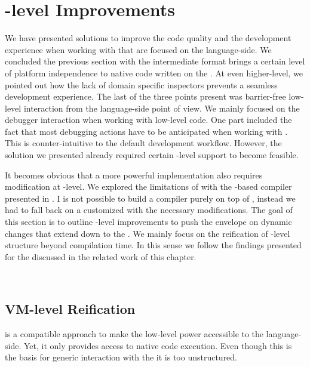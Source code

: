 \section{\VM-level Improvements}
We have presented solutions to improve the code quality and the development experience when working with \B that are focused on the language-side.
We concluded the previous section with the \VCPU intermediate format brings a certain level of platform independence to native code written on the \B.
At even higher-level, we pointed out how the lack of domain specific inspectors prevents a seamless development experience.
The last of the three points present was barrier-free low-level interaction from the language-side point of view.
We mainly focused on the debugger interaction when working with low-level \B code.
One part included the fact that most debugging actions have to be anticipated when working with \B.
This is counter-intuitive to the default \PH development workflow.
However, the solution we presented already required certain \VM-level support to become feasible.

It becomes obvious that a more powerful \B implementation also requires modification at \VM-level.
We explored the limitations of \B with \NBJ the \B-based \JIT compiler presented in .
I is not possible to build a \JIT compiler purely on top of \B, instead we had to fall back on a customized \VM with the necessary modifications.
The goal of this section is to outline \VM-level improvements to push the envelope on dynamic changes that extend down to the \VM.
We mainly focus on the reification of \VM-level structure beyond compilation time.
In this sense we follow the findings presented for the \Klein \VM discussed in the related work  of this chapter.

\\

\subsection{VM-level Reification}
\B is a compatible approach to make the low-level power accessible to the language-side.
Yet, it only provides access to native code execution.
Even though this is the basis for generic interaction with the \VM it is too unstructured.

